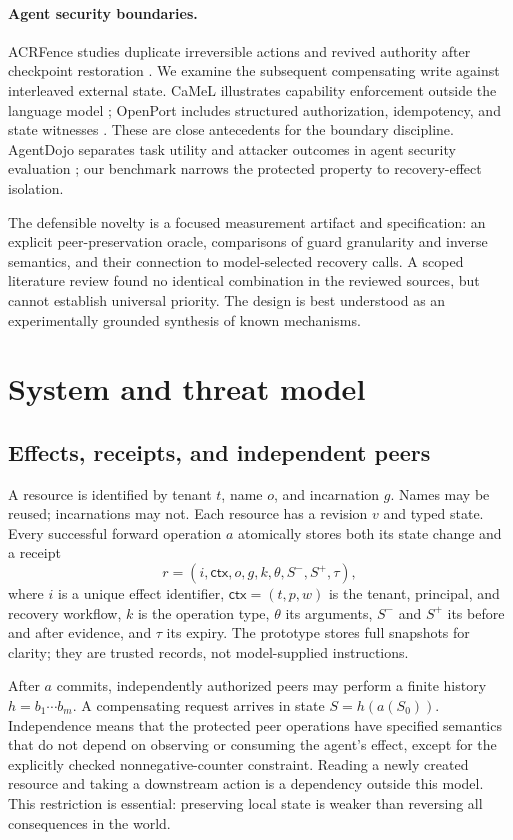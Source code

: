 \documentclass[10pt,twocolumn]{article}
\newcommand{\ctx}{\mathsf{ctx}}
\begin{document}
\paragraph{Agent security boundaries.}
ACRFence studies duplicate irreversible actions and revived authority after checkpoint restoration \cite{acrfence}. We examine the subsequent compensating write against interleaved external state. CaMeL illustrates capability enforcement outside the language model \cite{camel}; OpenPort includes structured authorization, idempotency, and state witnesses \cite{openport}. These are close antecedents for the boundary discipline. AgentDojo separates task utility and attacker outcomes in agent security evaluation \cite{agentdojo}; our benchmark narrows the protected property to recovery-effect isolation.

The defensible novelty is a focused measurement artifact and specification: an explicit peer-preservation oracle, comparisons of guard granularity and inverse semantics, and their connection to model-selected recovery calls. A scoped literature review found no identical combination in the reviewed sources, but cannot establish universal priority. The design is best understood as an experimentally grounded synthesis of known mechanisms.

\section{System and threat model}
\subsection{Effects, receipts, and independent peers}
A resource is identified by tenant $t$, name $o$, and incarnation $g$. Names may be reused; incarnations may not. Each resource has a revision $v$ and typed state. Every successful forward operation $a$ atomically stores both its state change and a receipt
\begin{equation}
 r=(i,\ctx,o,g,k,\theta,S^{-},S^{+},\tau),
\end{equation}
where $i$ is a unique effect identifier, $\ctx=(t,p,w)$ is the tenant, principal, and recovery workflow, $k$ is the operation type, $\theta$ its arguments, $S^{-}$ and $S^{+}$ its before and after evidence, and $\tau$ its expiry. The prototype stores full snapshots for clarity; they are trusted records, not model-supplied instructions.

After $a$ commits, independently authorized peers may perform a finite history $h=b_1\cdots b_m$. A compensating request arrives in state $S=h(a(S_0))$. Independence means that the protected peer operations have specified semantics that do not depend on observing or consuming the agent's effect, except for the explicitly checked nonnegative-counter constraint. Reading a newly created resource and taking a downstream action is a dependency outside this model. This restriction is essential: preserving local state is weaker than reversing all consequences in the world.
\end{document}
